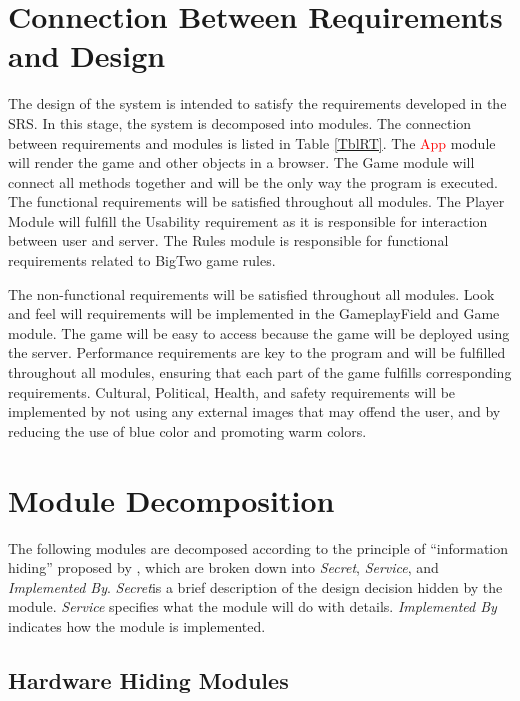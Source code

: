 \documentclass[12pt, titlepage]{article}
\begin{document}
\section{Connection Between Requirements and Design} \label{SecConnection}

The design of the system is intended to satisfy the requirements developed in
the SRS. In this stage, the system is decomposed into modules. The connection
between requirements and modules is listed in Table \ref{TblRT}. The \textcolor{red}{App} module will render the game and other objects in a browser. The Game module will connect all methods together and will be the only way the program is executed. The functional requirements will be satisfied throughout all modules. The Player Module will fulfill the Usability requirement as it is responsible for interaction between user and server. The Rules module is responsible for functional requirements related to BigTwo game rules. 

\noindent The non-functional requirements will be satisfied throughout all modules.
Look and feel will requirements will be implemented in the GameplayField and Game module. The game will be easy to access because the game will be deployed using the server. Performance requirements are key to the program and will be fulfilled throughout all modules, ensuring that each part of the game fulfills corresponding requirements. Cultural, Political, Health, and safety requirements will be implemented by not using any external images that may offend the user, and by reducing the use of blue color and promoting warm colors.

\section{Module Decomposition} \label{SecMD}

The following modules are decomposed according to the principle of ``information hiding'' proposed by \citet{ParnasEtAl1984}, which are broken down into \emph{Secret}, \emph{Service}, and \emph{Implemented By}. \emph{Secret}is a brief description of the design decision hidden by the module. \emph{Service} specifies what the module will do with details. \emph{Implemented By} indicates how the module is implemented. 

\subsection{Hardware Hiding Modules}
\end{document}
